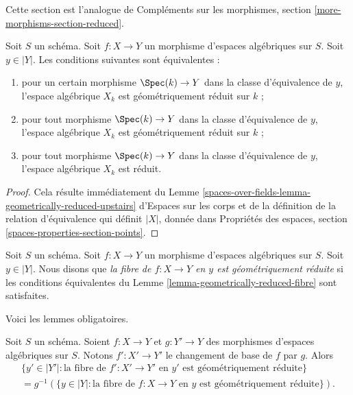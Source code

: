 \noindent
Cette section est l'analogue de
Compléments sur les morphismes, section \ref{more-morphisms-section-reduced}.

\begin{lemma}
\label{lemma-geometrically-reduced-fibre}
Soit $S$ un schéma. Soit $f : X \to Y$ un
morphisme d'espaces algébriques sur $S$. Soit $y \in |Y|$.
Les conditions suivantes sont équivalentes :
\begin{enumerate}
\item pour un certain morphisme $\Spec(k) \to Y$ dans la classe d'équivalence
de $y$, l'espace algébrique $X_k$ est géométriquement réduit sur $k$ ;
\item pour tout morphisme $\Spec(k) \to Y$ dans la classe d'équivalence
de $y$, l'espace algébrique $X_k$ est géométriquement réduit sur $k$ ;
\item pour tout morphisme $\Spec(k) \to Y$ dans la classe d'équivalence
de $y$, l'espace algébrique $X_k$ est réduit.
\end{enumerate}
\end{lemma}

\begin{proof}
Cela résulte immédiatement du Lemme
\ref{spaces-over-fields-lemma-geometrically-reduced-upstairs} d'Espaces sur les corps
et de la définition de la relation d'équivalence qui définit $|X|$,
donnée dans
Propriétés des espaces, section \ref{spaces-properties-section-points}.
\end{proof}

\begin{definition}
\label{definition-geometrically-reduced-fibre}
Soit $S$ un schéma. Soit $f : X \to Y$ un
morphisme d'espaces algébriques sur $S$. Soit $y \in |Y|$.
Nous disons que {\it la fibre de $f : X \to Y$ en $y$ est géométriquement réduite}
si les conditions équivalentes du
Lemme \ref{lemma-geometrically-reduced-fibre} sont satisfaites.
\end{definition}

\noindent
Voici les lemmes obligatoires.

\begin{lemma}
\label{lemma-base-change-fibres-geometrically-reduced}
Soit $S$ un schéma. Soient $f : X \to Y$ et $g : Y' \to Y$
des morphismes d'espaces algébriques sur $S$. Notons
$f' : X' \to Y'$ le changement de base de $f$ par $g$. Alors
\begin{align*}
\{y' \in |Y'| :
\text{la fibre de }f' : X' \to Y'\text{ en }y'
\text{ est géométriquement réduite}\} \\
= g^{-1}(\{y \in |Y| :
\text{la fibre de }f : X \to Y\text{ en }y
\text{ est géométriquement réduite}\}).
\end{align*}
\end{lemma}

